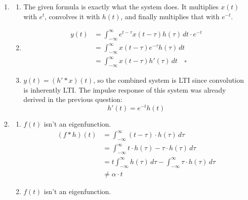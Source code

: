 \documentclass[12pt]{article}
\begin{document}
\begin{enumerate}
      \item \begin{enumerate}
                  \item The given formula is exactly what the system does.
                        It multiplies $x(t)$ with $e^t$, convolves it with $h(t)$,
                        and finally multiplies that with $e^{-t}$.
                  \item \[\begin{aligned}
                                    y(t)
                                     & = \int_{-\infty}^{\infty} e^{t-\tau} x(t-\tau) h(\tau)\,dt \cdot e^{-t} \\
                                     & = \int_{-\infty}^{\infty} x(t-\tau) e^{-\tau} h(\tau)\,dt               \\
                                     & = \int_{-\infty}^{\infty} x(t-\tau) h'(\tau)\,dt\quad\square
                              \end{aligned}\]
                  \item $y(t)=(h' * x)(t)$, so the combined system is LTI
                        since convolution is inherently LTI.
                        The impulse response of this system was already derived in the previous question:
                        \[h'(t)=e^{-t}h(t)\]
            \end{enumerate}
      \item \begin{enumerate}
                  \item $f(t)$ isn't an eigenfunction.
                        \begin{align*}
                              (f * h)(t)
                               & = \int_{-\infty}^{\infty} (t-\tau) \cdot h(\tau)\,d\tau                                        \\
                               & = \int_{-\infty}^{\infty} t \cdot h(\tau)-\tau \cdot h(\tau)\,d\tau                            \\
                               & = t \int_{-\infty}^{\infty} h(\tau)\,d\tau - \int_{-\infty}^{\infty} \tau \cdot h(\tau)\,d\tau \\
                               & \ne \alpha \cdot t
                        \end{align*}
                  \item $f(t)$ isn't an eigenfunction.
                        \begin{align*}

\end{align*}
\end{enumerate}
\end{enumerate}
\end{document}

